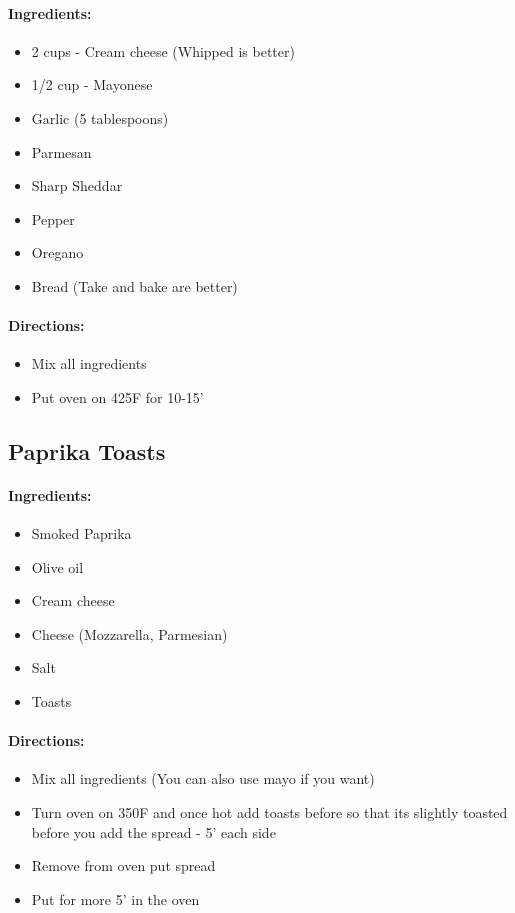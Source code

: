 \documentclass{article}
\begin{document}
\paragraph{Ingredients:}
\begin{itemize}
    \item 2 cups - Cream cheese (Whipped is better)
    \item 1/2 cup - Mayonese
    \item Garlic (5 tablespoons)
    \item Parmesan
    \item Sharp Sheddar
    \item Pepper
    \item Oregano
    \item Bread (Take and bake are better)
\end{itemize}

\paragraph{Directions:}
\begin{itemize}
    \item Mix all ingredients
    \item Put oven on 425F for 10-15'
\end{itemize}

\subsection{Paprika Toasts}

\paragraph{Ingredients:}
\begin{itemize}
    \item Smoked Paprika
    \item Olive oil
    \item Cream cheese
    \item Cheese (Mozzarella, Parmesian)
    \item Salt
    \item Toasts
\end{itemize}

\paragraph{Directions:}
\begin{itemize}
    \item Mix all ingredients (You can also use mayo if you want)
    \item Turn oven on 350F and once hot add toasts before so that its slightly toasted before you add the spread - 5' each side
    \item Remove from oven put spread
    \item Put for more 5' in the oven
\end{itemize}
\end{document}
